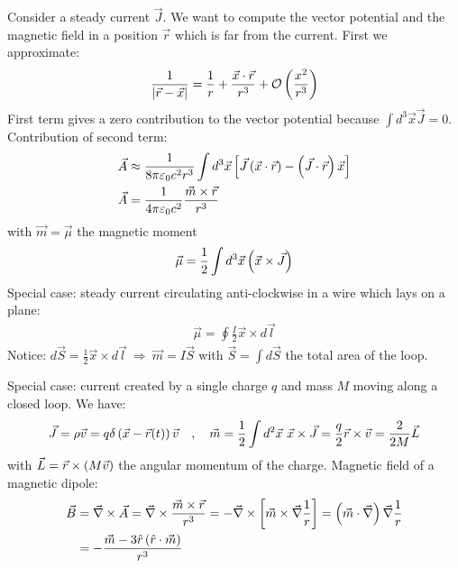 Consider a steady current $\vec{J}$. We want to compute the vector potential
and the magnetic field in a position $\vec{r}$ which is far from the
current. First we approximate:
\begin{align*}
    \frac{1}{\left\vert \vec{r} - \vec{x} \right\vert} = \frac{1}{r} + \frac{\vec{x} \cdot \vec{r}}{r^3} + \mathcal{O} \left( \frac{x^2}{r^3} \right)
\end{align*}
First term gives a zero contribution to the vector potential because
$\int d^3 \vec{x} \vec{J} = 0$. Contribution of second term:
\begin{align*}
    \vec{A} &\approx \frac{1}{8 \pi \varepsilon_0 c^2 r^3} \int d^3 \vec{x}
        \left[ \vec{J} \left( \vec{x} \cdot \vec{r} \right) - \left( \vec{J} \cdot \vec{r} \right) \vec{x} \right]
    \\
    \vec{A} &= \frac{1}{4 \pi \varepsilon_0 c^2} \frac{\vec{m} \times \vec{r}}{r^3}
\end{align*}
with $\vec{m} = \vec{\mu}$ the magnetic moment
\begin{align*}
    \vec{\mu} = \frac{1}{2} \int d^3 \vec{x} \left( \vec{x} \times \vec{J} \right)
\end{align*}
Special case: steady current circulating anti-clockwise in a wire which lays
on a plane:
\begin{align*}
    \vec{\mu} = \oint \frac{I}{2} \vec{x} \times d \vec{l}
\end{align*}
Notice: $d \vec{S} = \frac{1}{2} \vec{x} \times d \vec{l} \ \Rightarrow \
\vec{m} = I \vec{S}$ with $\vec{S} = \int d \vec{S}$ the total area of the loop.

\vspace{1\baselineskip}

Special case: current created by a single charge $q$ and mass $M$ moving
along a closed loop. We have:
\begin{align*}
    \vec{J} = \rho \vec{v} = q \delta \left( \vec{x} - \vec{r}(t) \right) \vec{v}
    \hspace{10pt} , \hspace{10pt}
    \vec{m} = \frac{1}{2} \int d^2 \vec{x} \ \vec{x} \times \vec{J}
        = \frac{q}{2} \vec{r} \times \vec{v}
        = \frac{2}{2 M} \vec{L}
\end{align*}
with $\vec{L} = \vec{r} \times \left( M \vec{v} \right)$ the angular momentum
of the charge. Magnetic field of a magnetic dipole:
\begin{align*}
    \vec{B}
    &= \vec{\nabla} \times \vec{A}
    = \vec{\nabla} \times \frac{\vec{m} \times \vec{r}}{r^3}
    = - \vec{\nabla} \times \left[ \vec{m} \times \vec{\nabla} \frac{1}{r} \right]
    = \left( \vec{m} \cdot \vec{\nabla} \right) \vec{\nabla} \frac{1}{r}
    \\
    &= - \frac{\vec{m} - 3 \hat{r} \left( \hat{r} \cdot \vec{m} \right)}{r^3}
\end{align*}

